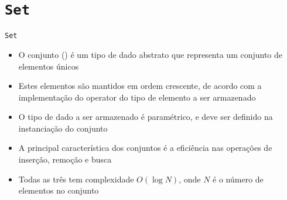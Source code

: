 \section{\texttt{Set}}

\begin{frame}[fragile]{\texttt{Set}}

    \begin{itemize}
        \item O conjunto () é um tipo de dado abstrato que representa um conjunto
            de elementos únicos

        \item Estes elementos são mantidos em ordem crescente, de acordo com a implementação
            do operator  do tipo de elemento a ser armazenado

        \item O tipo de dado a ser armazenado é paramétrico, e deve ser definido na instanciação
            do conjunto

        \item A principal característica dos conjuntos é a eficiência nas operações de inserção,
            remoção e busca

        \item Todas as três tem complexidade $O(\log N)$, onde $N$ é o número de elementos no conjunto
    \end{itemize}

\end{frame}

